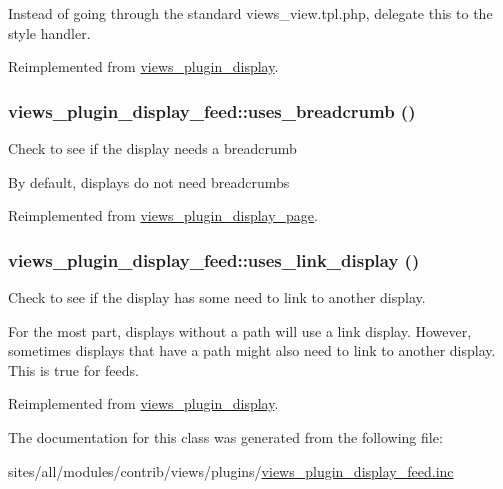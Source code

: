 Instead of going through the standard views\_\-view.tpl.php, delegate this to the style handler. 

Reimplemented from \hyperlink{classviews__plugin__display_cf230a4b44b452c9469f5df92e58e32e}{views\_\-plugin\_\-display}.\hypertarget{classviews__plugin__display__feed_4bc729e21f5578c13d420bbaf3c388c5}{
\subsubsection[{uses\_\-breadcrumb}]{\setlength{\rightskip}{0pt plus 5cm}views\_\-plugin\_\-display\_\-feed::uses\_\-breadcrumb ()}}
\label{classviews__plugin__display__feed_4bc729e21f5578c13d420bbaf3c388c5}


Check to see if the display needs a breadcrumb

By default, displays do not need breadcrumbs 

Reimplemented from \hyperlink{classviews__plugin__display__page_cbdafb32168f809b28e083d654399f3f}{views\_\-plugin\_\-display\_\-page}.\hypertarget{classviews__plugin__display__feed_a61e05dca3b82b696f6ea10356873a8b}{
\subsubsection[{uses\_\-link\_\-display}]{\setlength{\rightskip}{0pt plus 5cm}views\_\-plugin\_\-display\_\-feed::uses\_\-link\_\-display ()}}
\label{classviews__plugin__display__feed_a61e05dca3b82b696f6ea10356873a8b}


Check to see if the display has some need to link to another display.

For the most part, displays without a path will use a link display. However, sometimes displays that have a path might also need to link to another display. This is true for feeds. 

Reimplemented from \hyperlink{classviews__plugin__display_64d6d3c0e51efde2e050d36fbd3457dc}{views\_\-plugin\_\-display}.

The documentation for this class was generated from the following file:\begin{CompactItemize}
\item 
sites/all/modules/contrib/views/plugins/\hyperlink{views__plugin__display__feed_8inc}{views\_\-plugin\_\-display\_\-feed.inc}\end{CompactItemize}
